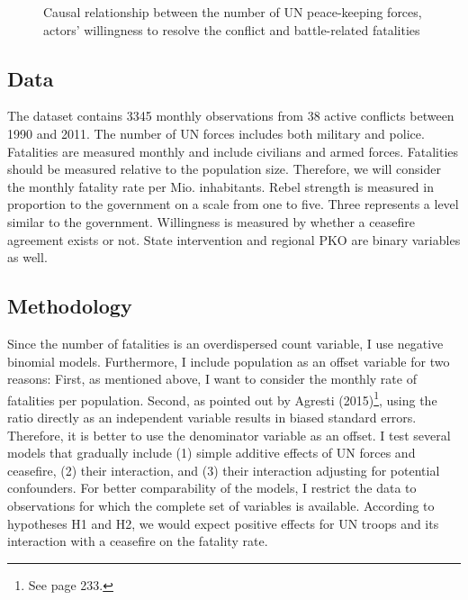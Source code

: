 \documentclass[12pt,english,a4paper,oneside]{article}
\begin{document}
\begin{figure}[H]
\label{fig:causal}
\centering

  
  \caption{Causal relationship between the number of UN peace-keeping forces, actors' willingness to resolve the conflict and battle-related fatalities}

\end{figure}

\hypertarget{data}{%
\subsection{Data}\label{data}}

The dataset contains 3345 monthly observations from 38 active conflicts between 1990 and 2011. The number of UN forces includes both military and police. Fatalities are measured monthly and include civilians and armed forces. Fatalities should be measured relative to the population size. Therefore, we will consider the monthly fatality rate per Mio. inhabitants. Rebel strength is measured in proportion to the government on a scale from one to five. Three represents a level similar to the government. Willingness is measured by whether a ceasefire agreement exists or not. State intervention and regional PKO are binary variables as well.

\hypertarget{methodology}{%
\subsection{Methodology}\label{methodology}}

Since the number of fatalities is an overdispersed count variable, I use negative binomial models. Furthermore, I include population as an offset variable for two reasons: First, as mentioned above, I want to consider the monthly rate of fatalities per population. Second, as pointed out by Agresti (2015)\footnote{See page 233.}, using the ratio directly as an independent variable results in biased standard errors. Therefore, it is better to use the denominator variable as an offset. I test several models that gradually include (1) simple additive effects of UN forces and ceasefire, (2) their interaction, and (3) their interaction adjusting for potential confounders. For better comparability of the models, I restrict the data to observations for which the complete set of variables is available. According to hypotheses H1 and H2, we would expect positive effects for UN troops and its interaction with a ceasefire on the fatality rate.
\end{document}
